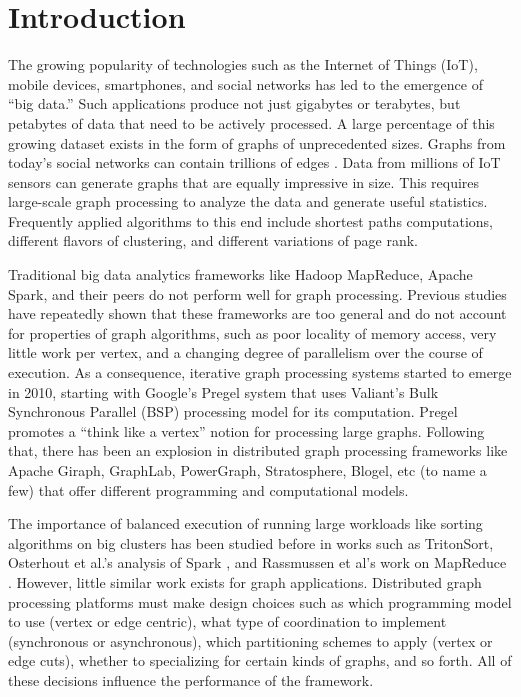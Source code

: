 \section{Introduction}
\label{sec:intro}

The growing popularity of technologies such as the Internet of Things (IoT), 
mobile devices, smartphones, and social networks has led to the emergence of 
``big data.'' Such applications 
produce not just gigabytes or terabytes, but petabytes of data that need to be 
actively processed. A large percentage of this growing dataset exists in the 
form of graphs of unprecedented sizes. Graphs from today's social networks 
can contain
trillions of edges \cite{GiraphAtFacebook}. Data from millions of IoT sensors 
can generate graphs
that are equally impressive in size. This requires large-scale graph processing 
to analyze the data and generate useful statistics. Frequently applied 
algorithms to this end include shortest paths 
computations, different flavors of clustering, and different variations of page rank.

Traditional big data analytics frameworks like Hadoop MapReduce\cite{Dean04}, 
Apache Spark\cite{Zaharia:2012:RDD:2228298.2228301}, and their peers do not
perform well for graph processing. Previous studies 
\cite{Ammar:2018:EAD:3231751.3242935, Guo:2014:WGP:2650283.2650530} have 
repeatedly shown that these frameworks are too general 
and do not account for properties of graph algorithms, such as poor locality of 
memory access, 
very little work per vertex, and a changing degree of parallelism over the course of execution.
As a consequence, iterative graph processing systems started to emerge in 2010, starting with Google's 
Pregel\cite{Malewicz:2010:PSL:1807167.1807184} system that uses Valiant's Bulk 
Synchronous Parallel (BSP) 
processing model for its computation. Pregel promotes a ``think like a vertex'' 
notion for processing large 
graphs. Following that, there has been an explosion in distributed graph processing frameworks like 
Apache Giraph\cite{ApacheGiraph}, GraphLab\cite{GraphLab}, PowerGraph\cite{PowerGraph}, 
Stratosphere\cite{Stratosphere}, Blogel\cite{Blogel}, etc (to name a few) that 
offer different 
programming and computational models.

The importance of balanced execution of running large workloads like sorting 
algorithms on big clusters has been 
studied before in works such as 
TritonSort\cite{Rasmussen:2013:TBE:2427631.2427634}, Osterhout et al.'s 
analysis of Spark \cite{Ousterhout:2015:MSP:2789770.2789791}, and Rassmussen et 
al's work on MapReduce \cite{Rasmussen:2012:TIM:2391229.2391242}. 
However, little similar work exists for graph applications. Distributed graph 
processing platforms must make design choices such as which 
programming model to use (vertex or edge centric), what type of coordination to 
implement (synchronous or asynchronous), which partitioning schemes to apply 
(vertex or edge cuts), whether to specializing for certain kinds 
of graphs, and so forth. All of these decisions influence the performance 
of the framework. 

